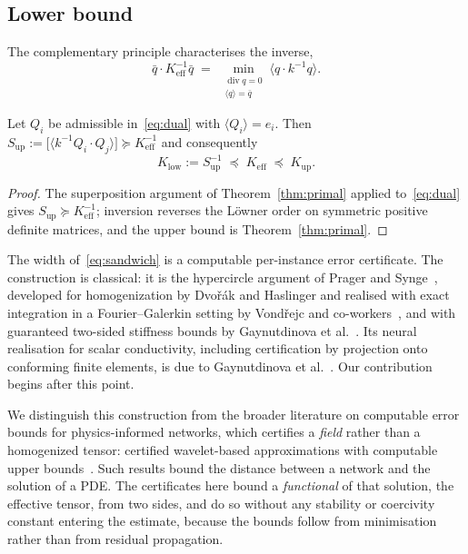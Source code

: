 \subsection{Lower bound}

The complementary principle characterises the inverse,
%
\begin{equation}
  \bar q \cdot K_{\mathrm{eff}}^{-1} \bar q
  \;=\; \min_{\substack{\operatorname{div} q = 0 \\ \langle q \rangle = \bar q}}
  \big\langle q \cdot k^{-1} q \big\rangle .
  \label{eq:dual}
\end{equation}
%
\begin{theorem}
\label{thm:dual}
Let $Q_i$ be admissible in~\eqref{eq:dual} with $\langle Q_i \rangle = e_i$.
Then $S_{\mathrm{up}} := \big[\langle k^{-1} Q_i \cdot Q_j\rangle\big]
\succeq K_{\mathrm{eff}}^{-1}$ and consequently
%
\begin{equation}
  K_{\mathrm{low}} := S_{\mathrm{up}}^{-1} \;\preceq\; K_{\mathrm{eff}}
  \;\preceq\; K_{\mathrm{up}} .
  \label{eq:sandwich}
\end{equation}
\end{theorem}

\begin{proof}
The superposition argument of Theorem~\ref{thm:primal} applied
to~\eqref{eq:dual} gives $S_{\mathrm{up}} \succeq K_{\mathrm{eff}}^{-1}$;
inversion reverses the L\"owner order on symmetric positive definite
matrices, and the upper bound is Theorem~\ref{thm:primal}.
\end{proof}

The width of~\eqref{eq:sandwich} is a computable per-instance error
certificate. The construction is classical: it is the hypercircle
argument of Prager and Synge~\cite{PragerSynge1947}, developed for
homogenization by Dvo\v{r}\'ak and Haslinger and realised with exact
integration in a Fourier--Galerkin setting by Vond\v{r}ejc and
co-workers~\cite{Vondrejc2015,Vondrejc2016}, and with guaranteed two-sided
stiffness bounds by Gaynutdinova et al.~\cite{Gaynutdinova2023}. Its neural realisation for
scalar conductivity, including certification by projection onto conforming
finite elements, is due to Gaynutdinova et al.~\cite{Gaynutdinova2026}.
Our contribution begins after this point.

We distinguish this construction from the broader literature on computable
error bounds for physics-informed networks, which certifies a \emph{field}
rather than a homogenized tensor: certified wavelet-based
approximations with computable upper bounds~\cite{Ernst2024}. Such results bound the
distance between a network and the solution of a PDE. The certificates here
bound a \emph{functional} of that solution, the effective tensor, from two sides, and do so without any stability or coercivity constant entering
the estimate, because the bounds follow from minimisation rather than from
residual propagation.

